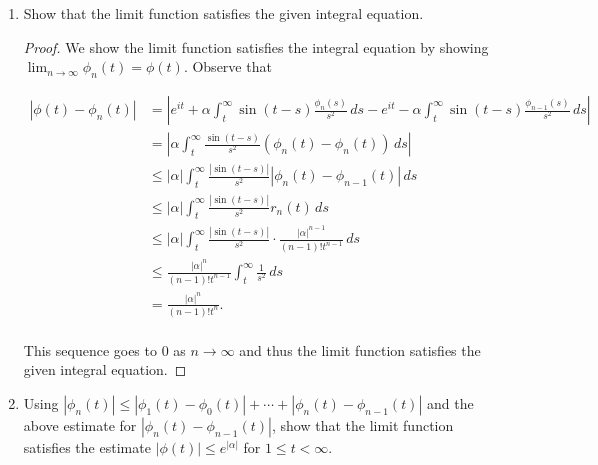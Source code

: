 \documentclass[11pt,oneside,english]{amsart}
\theoremstyle{definition}
\newcommand{\lom}[2]{\lim_{{#1}\rightarrow{#2}}}
\begin{document}
\begin{enumerate}
\begin{enumerate}
\begin{proof}
Note that $|\sin(t-s)|\leq1$ and thus $\frac{|\sin(t-s)|}{s^p}\leq\frac{1}{s^p}$. By the comparison test for integrals, $\int_t^\infty \frac{|\sin(t-s)|}{s^p}\,ds\leq\int_t^\infty\frac{1}{s^p}\,ds$, and the integral on the right hand side converges to $\frac{1}{(p-1)t^{p-1}}$. Therefore, we have

\[
r_p(t)\leq\frac{|\alpha|^{p-1}}{(p-2)!}\int_t^\infty\frac{1}{s^p}\,ds=\frac{|\alpha|^{p-1}}{(p-2)!}\cdot\frac{1}{(p-1)t^{p-1}}=\frac{|\alpha|^{p-1}}{(p-1)!t^{p-1}}.
\]

Thus, the statement is proven for all $n\geq 1$.
\end{proof}

\item Show that the limit function satisfies the given integral equation.

\begin{proof}
We show the limit function satisfies the integral equation by showing $\lom{n}{\infty}\phi_n(t)=\phi(t)$. Observe that

\begin{align*}
\left|\phi(t)-\phi_n(t)\right|&=\left|e^{it}+\alpha \int_t^\infty\sin(t-s)\frac{\phi_n(s)}{s^2}\,ds-e^{it}-\alpha \int_t^\infty\sin(t-s)\frac{\phi_{n-1}(s)}{s^2}\,ds\right|\\[2mm]
&=\left|\alpha\int_t^\infty\frac{\sin(t-s)}{s^2}(\phi_n(t)-\phi_n(t))\,ds\right|\\[2mm]
&\leq|\alpha|\int_t^\infty\frac{|\sin(t-s)|}{s^2}|\phi_n(t)-\phi_{n-1}(t)|\,ds\\[2mm]
&\leq|\alpha|\int_t^\infty\frac{|\sin(t-s)|}{s^2}r_n(t)\,ds\\[2mm]
&\leq|\alpha|\int_t^\infty\frac{|\sin(t-s)|}{s^2}\cdot\frac{|\alpha|^{n-1}}{(n-1)!t^{n-1}}\,ds\\[2mm]
&\leq\frac{|\alpha|^n}{(n-1)!t^{n-1}}\int_t^\infty\frac{1}{s^2}\,ds\\[2mm]
&=\frac{|\alpha|^n}{(n-1)!t^n}.\\[2mm]
\end{align*}

This sequence goes to 0 as $n\rightarrow \infty$ and thus the limit function satisfies the given integral equation.
\end{proof}

\item Using $|\phi_n(t)|\leq|\phi_1(t)-\phi_0(t)|+\cdots+|\phi_n(t)-\phi_{n-1}(t)|$ and the above estimate for $|\phi_n(t)-\phi_{n-1}(t)|$, show that the limit function satisfies the estimate $|\phi(t)|\leq e^{|\alpha|}$ for $1\leq t<\infty$. 


\end{enumerate}
\end{enumerate}
\end{document}
